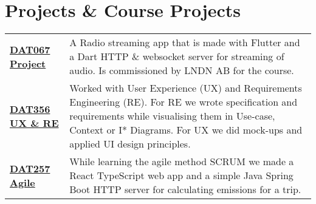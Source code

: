\section{Projects \& Course Projects}\label{sec:projects-&-course-projects}
\begin{tabular}{>{\footnotesize\bfseries} p{32pt} >{\footnotesize}p{}}
    \href{https://www.student.chalmers.se/sp/course?course_id=34088}{DAT067 Project} &
    A Radio streaming app that is made with Flutter and a Dart HTTP \& websocket server for streaming of audio.
    Is commissioned by LNDN AB for the course.
    \vspace{3px} \\
    \href{https://www.student.chalmers.se/sp/course?course_id=33536}{DAT356 UX \& RE} &
    Worked with User Experience (UX) and Requirements Engineering (RE).
    For RE we wrote specification and requirements while visualising them in Use-case, Context or I* Diagrams.
    For UX we did mock-ups and applied UI design principles.
    \vspace{3px} \\
    \href{https://www.student.chalmers.se/sp/course?course_id=34092}{DAT257 Agile} &
    While learning the agile method SCRUM we made a React TypeScript web app and a simple Java Spring Boot HTTP server for calculating emissions for a trip.
    \vspace{3px} \\
\end{tabular}
 
